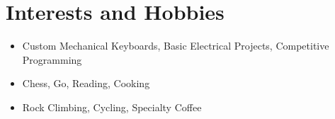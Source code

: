\documentclass[a4paper,12pt]{article}
\begin{document}
\section{Interests and Hobbies}
\begin{itemize}[topsep=2pt,itemsep=2pt,partopsep=2pt, parsep=2pt]
   \item Custom Mechanical Keyboards, Basic Electrical Projects, Competitive Programming
   \item Chess, Go, Reading, Cooking
   \item Rock Climbing, Cycling,  Specialty Coffee
\end{itemize}
\end{document}
